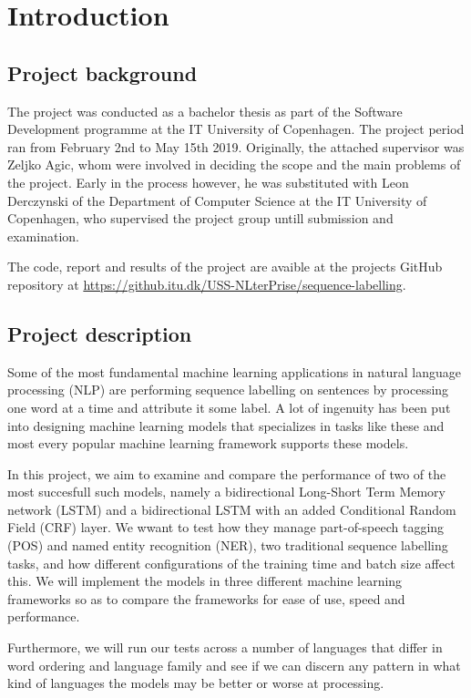 
\section{Introduction}

\subsection{Project background}

The project was conducted as a bachelor thesis as part of the Software
Development programme at the IT University of Copenhagen. The project period ran
from February 2nd to May 15th 2019. Originally, the attached supervisor was
Zeljko Agic, whom were involved in deciding the scope and the main problems of
the project. Early in the process however, he was substituted with Leon
Derczynski of the Department of Computer Science at the IT University of
Copenhagen, who supervised the project group untill submission and examination.

The code, report and results of the project are avaible at the projects GitHub
repository at \url{https://github.itu.dk/USS-NLterPrise/sequence-labelling}.


\subsection{Project description}

Some of the most fundamental machine learning applications in natural language
processing (NLP) are performing sequence labelling on sentences by processing
one word at a time and attribute it some label. A lot of ingenuity has been put
into designing machine learning models that specializes in tasks like these and
most every popular machine learning framework supports these models.

In this project, we aim to examine and compare the performance of two of the
most succesfull such models, namely a bidirectional Long-Short Term Memory
network (LSTM) and a bidirectional LSTM with an added Conditional Random Field
(CRF) layer. We wwant to test how they manage part-of-speech tagging (POS) and
named entity recognition (NER), two traditional sequence labelling tasks, and how
different configurations of the training time and batch size affect this.
We will implement the models in three different machine learning frameworks so
as to compare the frameworks for ease of use, speed and performance.

Furthermore, we will run our tests across a number of languages that differ in
word ordering and language family and see if we can discern any pattern in what
kind of languages the models may be better or worse at processing.


